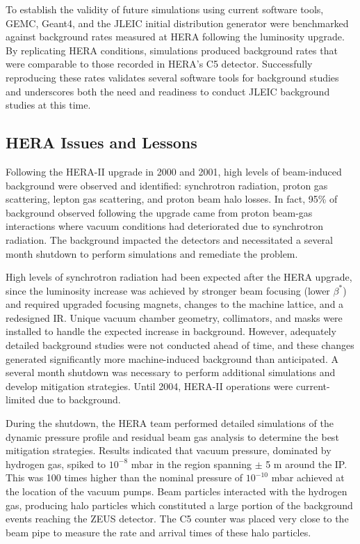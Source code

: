 To establish the validity of future simulations using current software tools, GEMC, Geant4, and the JLEIC initial distribution generator were benchmarked against background rates measured at HERA following the luminosity upgrade.  By replicating HERA conditions, simulations produced background rates that were comparable to those recorded in HERA's C5 detector.  Successfully reproducing these rates validates several software tools for background studies and underscores both the need and readiness to conduct JLEIC background studies at this time.

\subsection{HERA Issues and Lessons}

Following the HERA-II upgrade in 2000 and 2001, high levels of beam-induced background were observed and identified: synchrotron radiation, proton gas scattering, lepton gas scattering, and proton beam halo losses.   In fact, 95\% of background observed following the upgrade came from proton beam-gas interactions where vacuum conditions had deteriorated due to synchrotron radiation.  The background impacted the detectors and necessitated a several month shutdown to perform simulations and remediate the problem\cite{Holzer:2009}.

High levels of synchrotron radiation had been expected after the HERA upgrade, since the luminosity increase was achieved by stronger beam focusing (lower $\beta^*$) and required upgraded focusing magnets, changes to the machine lattice, and a redesigned IR. Unique vacuum chamber geometry, collimators, and masks were installed to handle the expected increase in background.  However, adequately detailed background studies were not conducted ahead of time, and these changes generated significantly more machine-induced background than anticipated.  A several month shutdown was necessary to perform additional simulations and develop mitigation strategies.  Until 2004, HERA-II operations were current-limited due to background\cite{Holzer:2009}\cite{Seidel:2004}.

During the shutdown, the HERA team performed detailed simulations of the dynamic pressure profile and residual beam gas analysis to determine the best mitigation strategies.  Results indicated that vacuum pressure, dominated by hydrogen gas, spiked to $10^{-8}$ mbar in the region spanning $\pm$ 5 m around the IP.   This  was 100 times higher than the nominal pressure of $10^{-10}$ mbar achieved at the location of the vacuum pumps.  Beam particles interacted with the hydrogen gas, producing halo particles which constituted a large portion of the background events reaching the ZEUS detector.  The C5 counter was placed very close to the beam pipe to measure the rate and arrival times of these halo particles\cite{Furletova:2015pma}.

